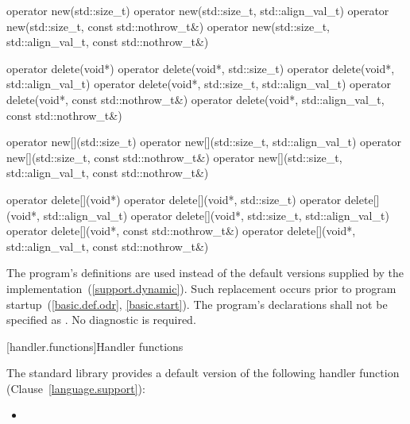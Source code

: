 %
%
\begin{codeblock}
operator new(std::size_t)
operator new(std::size_t, std::align_val_t)
operator new(std::size_t, const std::nothrow_t&)
operator new(std::size_t, std::align_val_t, const std::nothrow_t&)
\end{codeblock}%
%
%
\begin{codeblock}
operator delete(void*)
operator delete(void*, std::size_t)
operator delete(void*, std::align_val_t)
operator delete(void*, std::size_t, std::align_val_t)
operator delete(void*, const std::nothrow_t&)
operator delete(void*, std::align_val_t, const std::nothrow_t&)
\end{codeblock}%
%
%
\begin{codeblock}
operator new[](std::size_t)
operator new[](std::size_t, std::align_val_t)
operator new[](std::size_t, const std::nothrow_t&)
operator new[](std::size_t, std::align_val_t, const std::nothrow_t&)
\end{codeblock}%
%
%
\begin{codeblock}
operator delete[](void*)
operator delete[](void*, std::size_t)
operator delete[](void*, std::align_val_t)
operator delete[](void*, std::size_t, std::align_val_t)
operator delete[](void*, const std::nothrow_t&)
operator delete[](void*, std::align_val_t, const std::nothrow_t&)
\end{codeblock}

\pnum
The program's definitions are used instead of the default versions supplied by
the implementation~(\ref{support.dynamic}).
Such replacement occurs prior to program startup~(\ref{basic.def.odr}, \ref{basic.start}).
%
The program's declarations shall not be specified as
.
No diagnostic is required.

[handler.functions]{Handler functions}

\pnum
The \Cpp standard library provides a default version of the following handler
function (Clause~\ref{language.support}):

\begin{itemize}
\item
{}
%
\end{itemize}

